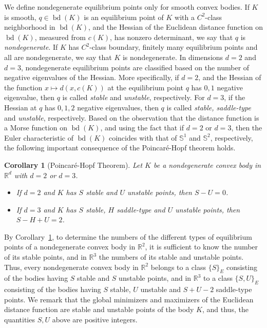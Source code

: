 \documentclass[twoside]{amsart}
\theoremstyle{plain}
\newtheorem{corollary}[theorem]{Corollary}
\theoremstyle{definition}
\numberwithin{equation}{section}
\renewcommand{\Re}{\mathbb R}
\newcommand{\Sph}{\mathbb{S}}
\DeclareMathOperator{\bd}{bd}
\begin{document}
We define nondegenerate equilibrium points only for smooth convex bodies. If $K$ is smooth, $q \in \bd(K)$ is an equilibrium point of $K$ with a $C^2$-class neighborhood in $\bd(K)$, and the Hessian of the Euclidean distance function on $\bd(K)$, measured from $c(K)$, has nonzero determinant, we say that $q$ is \emph{nondegenerate}. If $K$ has $C^2$-class boundary, finitely many equilibrium points and all are nondegenerate, we say that $K$ is nondegenerate.
In dimensions $d=2$ and $d=3$, nondegenerate equilibrium points are classified based on the number of negative eigenvalues of the Hessian. More specifically, if $d=2$, and the Hessian of the function $x \mapsto d(x,c(K))$ at the equilibrium point $q$ has $0,1$ negative eigenvalue, then $q$ is called \emph{stable} and \emph{unstable}, respectively. For $d=3$, if the Hessian at $q$ has $0,1,2$ negative eigenvalues, then $q$ is called \emph{stable, saddle-type} and \emph{unstable}, respectively.
Based on the observation that the distance function is a Morse function on $\bd(K)$, and using the fact that if $d=2$ or $d=3$, then the Euler characteristic of $\bd(K)$ coincides with that of $\Sph^1$ and $\Sph^2$, respectively, the following important consequence of the Poincar\'e-Hopf theorem \cite{Hopf} holds.

\begin{corollary}[Poincar\'e-Hopf Theorem]\label{cor:PH}
Let $K$ be a nondegenerate convex body in $\Re^d$ with $d=2$ or $d=3$.
\begin{itemize}
\item[(1)] If $d=2$ and $K$ has $S$ stable and $U$ unstable points, then $S-U=0$.
\item[(2)] If $d=3$ and $K$ has $S$ stable, $H$ saddle-type and $U$ unstable points, then $S-H+U=2$.
\end{itemize}
\end{corollary}

By Corollary~\ref{cor:PH}, to determine the numbers of the different types of equilibrium points of a nondegenerate convex body in $\Re^2$, it is sufficient to know the number of its stable points, and in $\Re^3$ the numbers of its stable and unstable points. Thus, every nondegenerate convex body in $\Re^2$ belongs to a class $\{S\}_E$ consisting of the bodies having $S$ stable and $S$ unstable points, and in $\Re^3$ to a class $\{S,U \}_E$ consisting of the bodies having $S$ stable, $U$ unstable and $S+U-2$ saddle-type points. We remark that the global minimizers and maximizers of the Euclidean distance function are stable and unstable points of the body $K$, and thus, the quantities $S,U$ above are positive integers.
\end{document}
